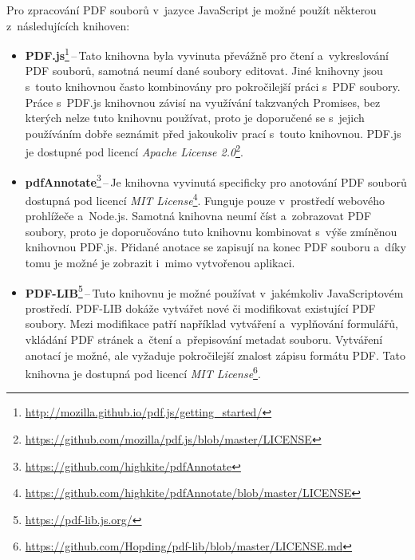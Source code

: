 Pro zpracování PDF souborů v~jazyce JavaScript je možné použít některou
z~následujících knihoven:
\begin{itemize}
    \item \textbf{PDF.js}\footnote{
    \href{http://mozilla.github.io/pdf.js/getting_started/}{http://mozilla.github.io/pdf.js/getting\_started/}
    }\,--\,Tato knihovna byla vyvinuta převážně pro čtení a~vykreslování PDF
    souborů, samotná neumí dané soubory editovat. Jiné knihovny jsou s~touto
    knihovnou často kombinovány pro pokročilejší práci s~PDF soubory. Práce
    s~PDF.js knihovnou závisí na využívání takzvaných Promises, bez kterých nelze
    tuto knihovnu používat, proto je doporučené se s~jejich používáním dobře
    seznámit před jakoukoliv prací s~touto knihovnou. PDF.js je dostupné pod
    licencí \emph{Apache License 2.0}\footnote{
    \href{https://github.com/mozilla/pdf.js/blob/master/LICENSE}{https://github.com/mozilla/pdf.js/blob/master/LICENSE}}.
    
    \item \textbf{pdfAnnotate}\footnote{
    \href{https://github.com/highkite/pdfAnnotate}{https://github.com/highkite/pdfAnnotate}
    }\,--\,Je knihovna vyvinutá specificky pro anotování PDF souborů dostupná pod
    licencí \emph{MIT License}\footnote{
    \href{https://github.com/highkite/pdfAnnotate/blob/master/LICENSE}{https://github.com/highkite/pdfAnnotate/blob/master/LICENSE}
    }. Funguje pouze v~prostředí webového prohlížeče a~Node.js. Samotná knihovna
    neumí číst a~zobrazovat PDF soubory, proto je doporučováno tuto knihovnu
    kombinovat s~výše zmíněnou knihovnou PDF.js. Přidané anotace se zapisují
    na konec PDF souboru a~díky tomu je možné je zobrazit i~mimo vytvořenou
    aplikaci.
    
    \item \textbf{PDF-LIB}\footnote{
    \href{https://pdf-lib.js.org/}{https://pdf-lib.js.org/}
    }\,--\,Tuto knihovnu je možné používat v~jakémkoliv JavaScriptovém prostředí.
    PDF-LIB dokáže vytvářet nové či modifikovat existující PDF soubory. Mezi
    modifikace patří například vytváření a~vyplňování formulářů, vkládání PDF
    stránek a~čtení a~přepisování metadat souboru. Vytváření anotací je možné, ale
    vyžaduje pokročilejší znalost zápisu formátu PDF. Tato knihovna je dostupná
    pod licencí \emph{MIT License}\footnote{
    \href{https://github.com/Hopding/pdf-lib/blob/master/LICENSE.md}{https://github.com/Hopding/pdf-lib/blob/master/LICENSE.md}
    }.
\end{itemize}



